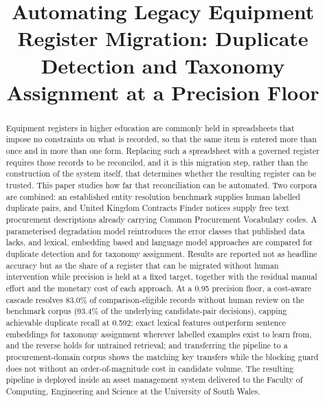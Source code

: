 \documentclass[conference]{IEEEtran}
\begin{document}
\title{Automating Legacy Equipment Register Migration: Duplicate Detection and Taxonomy Assignment at a Precision Floor}

\author{
}

\maketitle

\begin{abstract}
Equipment registers in higher education are commonly held in spreadsheets
that impose no constraints on what is recorded, so that the same item is
entered more than once and in more than one form. Replacing such a
spreadsheet with a governed register requires those records to be
reconciled, and it is this migration step, rather than the construction
of the system itself, that determines whether the resulting register can
be trusted. This paper studies how far that reconciliation can be
automated. Two corpora are combined: an established entity resolution
benchmark supplies human labelled duplicate pairs, and United Kingdom
Contracts Finder notices supply free text procurement descriptions
already carrying Common Procurement Vocabulary codes. A parameterised
degradation model reintroduces the error classes that published data
lacks, and lexical, embedding based and language model approaches are
compared for duplicate detection and for taxonomy assignment. Results are
reported not as headline accuracy but as the share of a register that can
be migrated without human intervention while precision is held at a fixed
target, together with the residual manual effort and the monetary cost of
each approach. At a 0.95 precision floor, a cost-aware cascade resolves
83.0\% of comparison-eligible records without human review on the
benchmark corpus (93.4\% of the underlying candidate-pair decisions),
capping achievable duplicate recall at 0.592; exact
lexical features outperform sentence embeddings for taxonomy
assignment wherever labelled examples exist to learn from, and the
reverse holds for untrained retrieval; and transferring the pipeline to
a procurement-domain corpus shows the matching key transfers while the
blocking guard does not without an order-of-magnitude cost in candidate
volume. The resulting pipeline is deployed inside an asset
management system delivered to the Faculty of Computing, Engineering and
Science at the University of South Wales.
\end{abstract}
\end{document}
